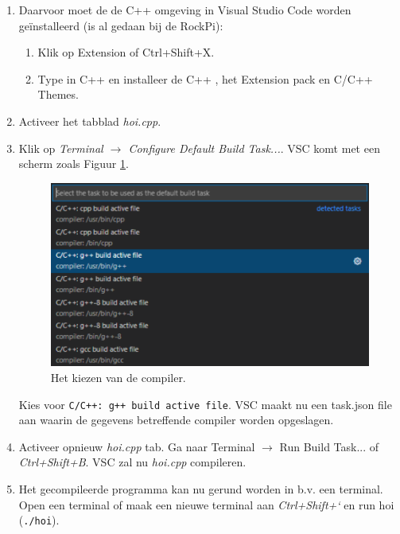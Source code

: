 \begin{enumerate}
     \begin{enumerate}
     	\item  Daarvoor moet de de C++ omgeving in Visual Studio Code worden geïnstalleerd (is al gedaan bij de RockPi):
     	\begin{enumerate}
     		\item Klik op Extension  of Ctrl+Shift+X.
     		\item Type in C++ en installeer de C++  , het Extension pack en C/C++ Themes.
        \end{enumerate}
     	\item Activeer het tabblad \textit{hoi.cpp}.
     	\item Klik op \textit{Terminal $\rightarrow$ Configure Default Build Task...}. VSC komt met een scherm zoals Figuur \ref{fig:vscComp}.
\begin{figure}[h!]
	\captionsetup{justification=centering}
	\includegraphics[width=0.6 \linewidth]{figuren/VSCcompile}
	\centering
	\caption{Het kiezen van de compiler.}
	\label{fig:vscComp}
\end{figure}     	
Kies voor \texttt{C/C++: g++ build active file}.
VSC maakt nu een task.json file aan waarin de gegevens betreffende compiler worden opgeslagen.
\item Activeer opnieuw \textit{hoi.cpp} tab. Ga naar Terminal $\rightarrow$ Run Build Task... of \textit{Ctrl+Shift+B}. VSC zal nu \textit{hoi.cpp} compileren.

\item Het gecompileerde programma kan nu gerund worden in b.v. een terminal. Open een terminal of maak een nieuwe terminal aan \textit{Ctrl+Shift+`} en run hoi (\texttt{./hoi}).
\end{enumerate}
     

\end{enumerate}
